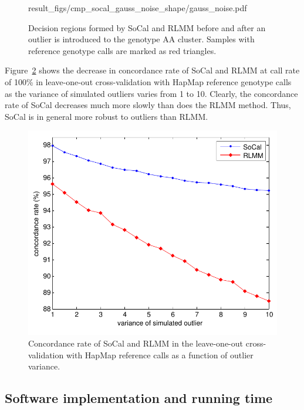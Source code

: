 \documentclass{scrartcl}
\begin{document}
\begin{figure}[H]
{            {result_figs/cmp_socal_gauss_noise_shape/gauss_noise.pdf}
        \label{fig:gauss_region_no_noise}
    }
    \caption{Decision regions formed by SoCal and RLMM before and after an
             outlier is introduced to the genotype AA cluster.
             Samples with reference genotype calls are marked as red
             triangles.}
    \label{fig:cmp_shape_noise}
\end{figure}

\par
Figure~\ref{fig:result_cmp_noise} shows the decrease in concordance rate of
SoCal and RLMM at call rate of 100\% in leave-one-out cross-validation with
HapMap reference genotype calls as the variance of simulated outliers varies
from 1 to 10.
Clearly, the concordance rate of SoCal decreases much more slowly than does
the RLMM method.
Thus, SoCal is in general more robust to outliers than RLMM.

\begin{figure}[H]
\centering
\includegraphics[scale=0.75]
{result_figs/cmp_socal_gauss_noise/socal_gauss_cmp_noise.pdf}
\caption{Concordance rate of SoCal and RLMM in the leave-one-out
cross-validation with HapMap reference calls as a function of outlier
variance.}
\label{fig:result_cmp_noise}
\end{figure}

\subsection{Software implementation and running time}
\end{document}
